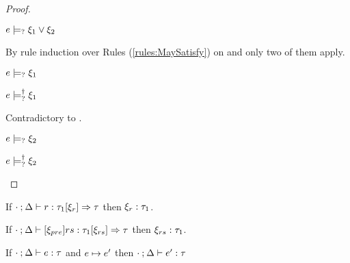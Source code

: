 \begin{proof}
\begin{byCases}
  \item[\text{(\ref{rule:CMSPossibly})}]
    \begin{pfsteps*}
    \item $e \models_{?} \xi_1 \vee \xi_2$  
    \end{pfsteps*}
    By rule induction over Rules (\ref{rules:MaySatisfy}) on  and only two of them apply.
    \begin{byCases}
    \item[\text{(\ref{rule:CMSOr1})}]
      \begin{pfsteps*}
      \item $e \models_{?} \xi_1$  
      \item $e \models_{?}^{\dag} \xi_1$ 
      \end{pfsteps*}
      Contradictory to .
    \item[\text{(\ref{rule:CMSOr2})}]
      \begin{pfsteps*}
      \item $e \models_{?} \xi_2$  
      \item $e \models_{?}^{\dag} \xi_2$ 
      \end{pfsteps*}
    \end{byCases}
  \end{byCases}
\end{proof}

\begin{lem}
  \label{lem:rule-constraint-typ}
  If $\cdot \mathbin{;} \Delta \vdash r : \tau_1 [\xi_r] \Rightarrow \tau$ then $\xi_r : \tau_1$.
\end{lem}

\begin{lem}
  \label{lem:rules-constraint-typ}
  If $\cdot \mathbin{;} \Delta \vdash [\xi_{pre}] rs : \tau_1 [\xi_{rs}] \Rightarrow \tau$ then $\xi_{rs} : \tau_1$.
\end{lem}

\begin{thm}[Preservation]
  \label{thrm:preservation}
  If $\cdot \mathbin{;} \Delta \vdash e : \tau$ and $e \mapsto e'$
  then $\cdot \mathbin{;} \Delta \vdash e' : \tau$
\end{thm}

